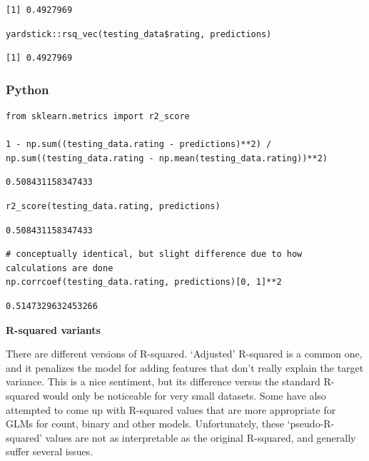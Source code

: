 \documentclass[
  letterpaper,
]{krantz}
\begin{document}
\begin{verbatim}
[1] 0.4927969
\end{verbatim}

\begin{verbatim}
yardstick::rsq_vec(testing_data$rating, predictions)
\end{verbatim}

\begin{verbatim}
[1] 0.4927969
\end{verbatim}

\subsubsection{Python}

\begin{verbatim}
from sklearn.metrics import r2_score

1 - np.sum((testing_data.rating - predictions)**2) / np.sum((testing_data.rating - np.mean(testing_data.rating))**2)
\end{verbatim}

\begin{verbatim}
0.508431158347433
\end{verbatim}

\begin{verbatim}
r2_score(testing_data.rating, predictions)
\end{verbatim}

\begin{verbatim}
0.508431158347433
\end{verbatim}

\begin{verbatim}
# conceptually identical, but slight difference due to how calculations are done
np.corrcoef(testing_data.rating, predictions)[0, 1]**2
\end{verbatim}

\begin{verbatim}
0.5147329632453266
\end{verbatim}

\begin{tcolorbox}[enhanced jigsaw, bottomrule=.15mm, rightrule=.15mm, colframe=quarto-callout-tip-color-frame, colback=white, breakable, arc=.35mm, left=2mm, opacityback=0, leftrule=.75mm, toprule=.15mm]

\vspace{-3mm}\textbf{R-squared variants}\vspace{3mm}

There are different versions of R-squared. `Adjusted' R-squared is a
common one, and it penalizes the model for adding features that don't
really explain the target variance. This is a nice sentiment, but its
difference versus the standard R-squared would only be noticeable for
very small datasets. Some have also attempted to come up with R-squared
values that are more appropriate for GLMs for count, binary and other
models. Unfortunately, these `pseudo-R-squared' values are not as
interpretable as the original R-squared, and generally suffer several
issues.

\end{tcolorbox}
\end{document}
